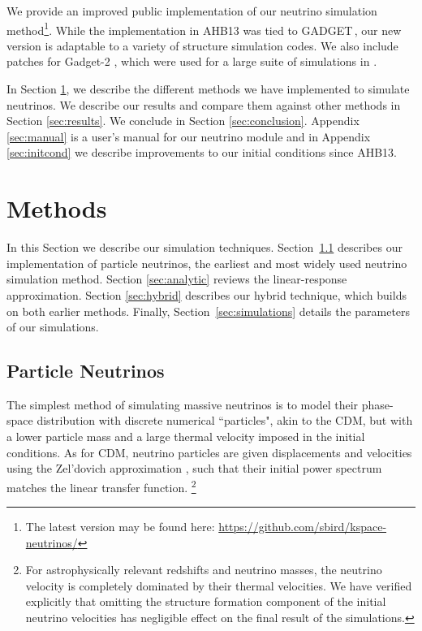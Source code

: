 \documentclass[useAMS, usenatbib]{mnras}
\newcommand{\gadget}{{\small GADGET\,}}
\begin{document}
We provide an improved public implementation of our neutrino simulation
method\footnote{The latest version may be found here: \url{https://github.com/sbird/kspace-neutrinos/}}.
While the implementation in AHB13 was tied to \gadget \citep{Springel_2005}, our new version is adaptable to a variety of structure simulation codes. We also include patches for Gadget-2 \citep{Springel_2005}, which were used for a large suite of simulations in \cite{Liu_2017}.

In Section \ref{sec:methods}, we describe the different methods we have implemented to simulate neutrinos. We describe our
results and compare them against other methods in Section \ref{sec:results}. We conclude in Section \ref{sec:conclusion}. Appendix \ref{sec:manual} is a user's manual for our neutrino module and in Appendix \ref{sec:initcond} we describe improvements to our initial conditions since AHB13.

\section{Methods}
\label{sec:methods}

In this Section we describe our simulation techniques. Section~\ref{sec:particle} describes our implementation of particle neutrinos, the earliest and most widely used neutrino simulation method. Section \ref{sec:analytic} reviews the linear-response approximation. Section \ref{sec:hybrid} describes our hybrid technique, which builds on both earlier methods. Finally, Section~\ref{sec:simulations} details the parameters of our simulations.

\subsection{Particle Neutrinos}
\label{sec:particle}

The simplest method of simulating massive neutrinos is to model their phase-space distribution with discrete numerical ``particles", akin to the CDM, but with a lower particle mass and a large thermal velocity imposed
in the initial conditions. As for CDM, neutrino particles are given displacements and velocities using the Zel'dovich approximation \citep{Zeldovich_1970}, such that their initial power spectrum matches the linear transfer function. \footnote{For astrophysically relevant redshifts and neutrino masses, the neutrino velocity is completely dominated by their thermal velocities. We have verified explicitly that omitting the structure formation component of the initial neutrino velocities has negligible effect on the final result of the simulations.}
\end{document}
